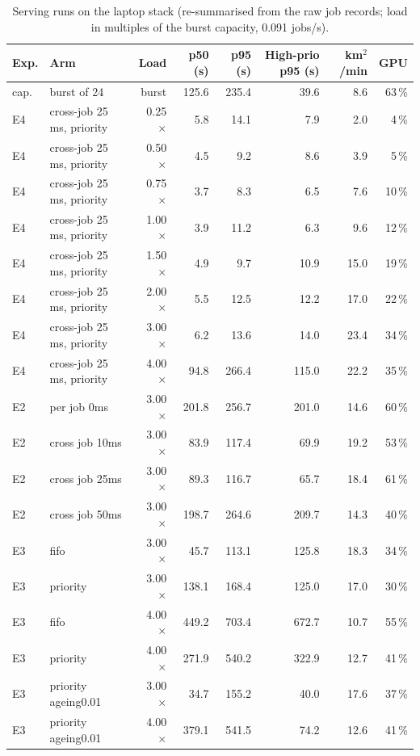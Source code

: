 \begin{table}[t]
\centering\small
\begin{tabular}{llrrrrrr}
\toprule
Exp. & Arm & Load & p50 (s) & p95 (s) & High-prio p95 (s) & km$^2$/min & GPU \\
\midrule
cap. & burst of 24 & burst & 125.6 & 235.4 & 39.6 & 8.6 & 63\,\% \\
E4 & cross-job 25 ms, priority & 0.25$\times$ & 5.8 & 14.1 & 7.9 & 2.0 & 4\,\% \\
E4 & cross-job 25 ms, priority & 0.50$\times$ & 4.5 & 9.2 & 8.6 & 3.9 & 5\,\% \\
E4 & cross-job 25 ms, priority & 0.75$\times$ & 3.7 & 8.3 & 6.5 & 7.6 & 10\,\% \\
E4 & cross-job 25 ms, priority & 1.00$\times$ & 3.9 & 11.2 & 6.3 & 9.6 & 12\,\% \\
E4 & cross-job 25 ms, priority & 1.50$\times$ & 4.9 & 9.7 & 10.9 & 15.0 & 19\,\% \\
E4 & cross-job 25 ms, priority & 2.00$\times$ & 5.5 & 12.5 & 12.2 & 17.0 & 22\,\% \\
E4 & cross-job 25 ms, priority & 3.00$\times$ & 6.2 & 13.6 & 14.0 & 23.4 & 34\,\% \\
E4 & cross-job 25 ms, priority & 4.00$\times$ & 94.8 & 266.4 & 115.0 & 22.2 & 35\,\% \\
\midrule
E2 & per job 0ms & 3.00$\times$ & 201.8 & 256.7 & 201.0 & 14.6 & 60\,\% \\
E2 & cross job 10ms & 3.00$\times$ & 83.9 & 117.4 & 69.9 & 19.2 & 53\,\% \\
E2 & cross job 25ms & 3.00$\times$ & 89.3 & 116.7 & 65.7 & 18.4 & 61\,\% \\
E2 & cross job 50ms & 3.00$\times$ & 198.7 & 264.6 & 209.7 & 14.3 & 40\,\% \\
\midrule
E3 & fifo & 3.00$\times$ & 45.7 & 113.1 & 125.8 & 18.3 & 34\,\% \\
E3 & priority & 3.00$\times$ & 138.1 & 168.4 & 125.0 & 17.0 & 30\,\% \\
E3 & fifo & 4.00$\times$ & 449.2 & 703.4 & 672.7 & 10.7 & 55\,\% \\
E3 & priority & 4.00$\times$ & 271.9 & 540.2 & 322.9 & 12.7 & 41\,\% \\
E3 & priority ageing0.01 & 3.00$\times$ & 34.7 & 155.2 & 40.0 & 17.6 & 37\,\% \\
E3 & priority ageing0.01 & 4.00$\times$ & 379.1 & 541.5 & 74.2 & 12.6 & 41\,\% \\
\bottomrule
\end{tabular}
\caption{Serving runs on the laptop stack (re-summarised from the raw job records;
load in multiples of the burst capacity, 0.091 jobs/s).}
\label{tab:load}
\end{table}
